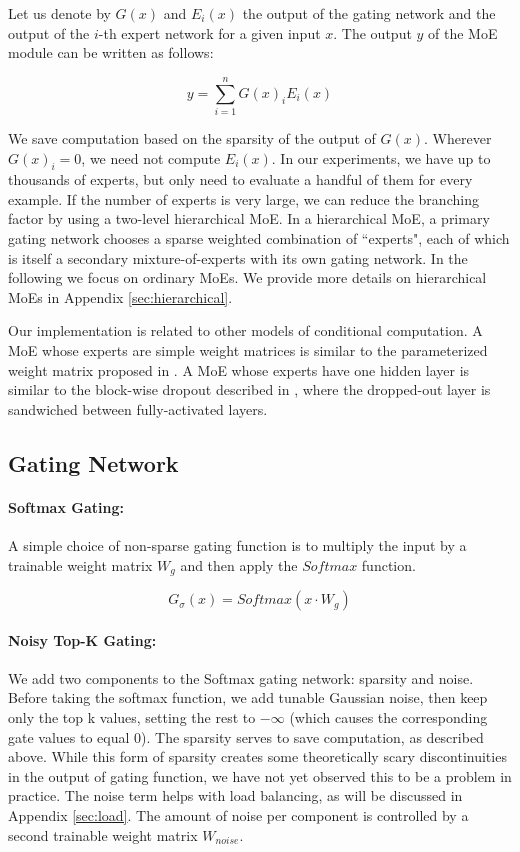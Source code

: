 \documentclass{article} %
\begin{document}
Let us denote by $G(x)$ and $E_i(x)$ the output of the gating network and the output of the $i$-th expert network for a given input $x$. The output $y$ of the MoE module can be written as follows:

\begin{equation}
y = \sum_{i=1}^{n}G(x)_iE_i(x)
\end{equation}

We save computation based on the sparsity of the output of $G(x)$.  Wherever $G(x)_i=0$, we need not compute $E_i(x)$.  In our experiments, we have up to thousands of experts, but only need to evaluate a handful of them for every example. If the number of experts is very large, we can reduce the branching factor by using a two-level hierarchical MoE. In a hierarchical MoE, a primary gating network chooses a sparse weighted combination of ``experts", each of which is itself a secondary mixture-of-experts with its own gating network. In the following we focus on ordinary MoEs. We provide more details on hierarchical MoEs in Appendix \ref{sec:hierarchical}.

Our implementation is related to other models of conditional computation. A MoE whose experts are simple weight matrices is similar to the parameterized weight matrix proposed in \citep{Cho14}.  A MoE whose experts have one hidden layer is similar to the block-wise dropout described in \citep{Bengio15:CondComp}, where the dropped-out layer is sandwiched between fully-activated layers.

\subsection{Gating Network}

\paragraph{Softmax Gating:} A simple choice of non-sparse gating function \citep{Jordan1994HME} is to multiply the input by a trainable weight matrix $W_g$ and then apply the $Softmax$ function.

\begin{equation}\label{eq:softmax}
G_\sigma(x) = Softmax(x \cdot W_g)
\end{equation}

\paragraph{Noisy Top-K Gating:}\label{sec:noisytopk} We add two components to the Softmax gating network: sparsity and noise.  Before taking the softmax function, we add tunable Gaussian noise, then keep only the top k values, setting the rest to $-\infty$ (which causes the corresponding gate values to equal $0$).  The sparsity serves to save computation, as described above.  While this form of sparsity creates some theoretically scary discontinuities in the output of gating function, we have not yet observed this to be a problem in practice.  The noise term helps with load balancing, as will be discussed in Appendix \ref{sec:load}.  The amount of noise per component is controlled by a second trainable weight matrix $W_{noise}$.
\end{document}
